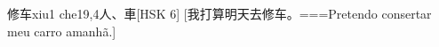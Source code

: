 \begin{EntryWithPhonetic}{修车}{xiu1 che1}{9,4}{⼈、⾞}[HSK 6]
  [我打算明天去修车。===Pretendo consertar meu carro amanhã.]
\end{EntryWithPhonetic}

